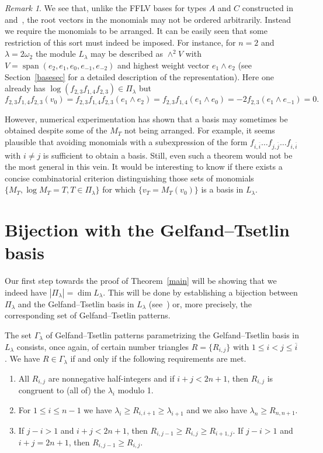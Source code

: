 \documentclass[10pt,a4paper]{article}
\theoremstyle{remark}\newtheorem{rema}[theo]{Remark}
\DeclareMathOperator{\spanned}{span}
\newcommand{\la}{\lambda}
\begin{document}
\begin{rema}\label{remAC}
We see that, unlike the FFLV bases for types $A$ and $C$ constructed in~\cite{FFL1} and~\cite{FFL2}, the root vectors in the monomials may not be ordered arbitrarily. Instead we require the monomials to be arranged. It can be easily seen that some restriction of this sort must indeed be imposed. For instance, for $n=2$ and $\lambda=2\omega_2$ the module $L_\la$ may be described as $\wedge^2 V$ with $V=\spanned(e_2,e_1,e_0,e_{-1},e_{-2})$ and highest weight vector $e_1\wedge e_2$ (see Section~\ref{basesec} for a detailed description of the representation). Here one already has $\log(f_{2,3}f_{1,4}f_{2,3})\in\Pi_\lambda$ but
\[
f_{2,3}f_{1,4}f_{2,3}(v_0)=f_{2,3}f_{1,4}f_{2,3}(e_1\wedge e_2)=f_{2,3}f_{1,4}(e_1\wedge e_0)=-2f_{2,3}(e_1\wedge e_{-1})=0.
\]

However, numerical experimentation has shown that a basis may sometimes be obtained despite some of the $M_T$ not being arranged. For example, it seems plausible that avoiding monomials with a subexpression of the form $f_{i,\overline i}\dots f_{j,\overline j}\dots f_{i,\overline i}$ with $i\neq j$ is sufficient to obtain a basis. Still, even such a theorem would not be the most general in this vein. It would be interesting to know if there exists a concise combinatorial criterion distinguishing those sets of monomials $\{M_T, \log M_T=T, T\in\Pi_\la\}$ for which $\{v_T=M_T(v_0)\}$ is a basis in $L_\lambda$.
\end{rema}


\section{Bijection with the Gelfand--Tsetlin basis}

Our first step towards the proof of Theorem~\ref{main} will be showing that we indeed have $|\Pi_\la|=\dim L_\la$. This will be done by establishing a bijection between $\Pi_\la$ and the Gelfand--Tsetlin basis in $L_\la$ (see~\cite{Mo}) or, more precisely, the corresponding set of Gelfand--Tsetlin patterns.

The set $\Gamma_\la$ of Gelfand--Tsetlin patterns parametrizing the Gelfand--Tsetlin basis in $L_\la$ consists, once again, of certain number triangles $R=\{R_{i,j}\}$ with $1\le i<j\le \overline i$. We have $R\in\Gamma_\la$ if and only if the following requirements are met.
\begin{enumerate}
\item\label{sec2_1} All $R_{i,j}$ are nonnegative half-integers and if $i+j<2n+1$, then $R_{i,j}$ is congruent to (all of) the $\lambda_i$ modulo 1.
\item\label{sec2_2}  For $1\le i\le n-1$ we have $\lambda_i\ge R_{i,i+1}\ge\la_{i+1}$ and we also have $\la_n\ge R_{n,n+1}$.
\item\label{sec2_3}  If $j-i>1$ and $i+j<2n+1$, then $R_{i,j-1}\ge R_{i,j}\ge R_{i+1,j}$. If $j-i>1$ and $i+j=2n+1$, then $R_{i,j-1}\ge R_{i,j}$.
\end{enumerate}
\end{document}
